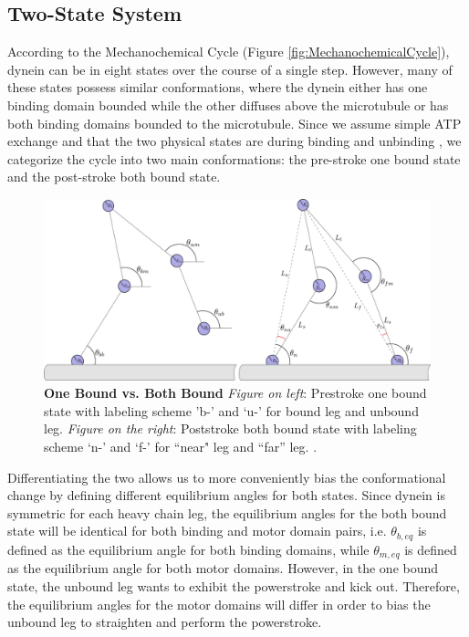 \subsection{Two-State System}
According to the Mechanochemical Cycle (Figure \ref{fig:MechanochemicalCycle}), dynein can be in eight states over the course of a single step. However, many of these states possess similar conformations, where the dynein either has one binding domain bounded while the other diffuses above the microtubule or has both binding domains bounded to the microtubule. Since we assume simple ATP exchange and that the two physical states are during binding and unbinding \cite{}, we categorize the cycle into two main conformations: the pre-stroke one bound state and the post-stroke both bound state.

\begin{figure}[H]
	\centering
	\includegraphics[width=0.9\columnwidth]{Figures/OB_vs_BB.PNG}
	\caption[One Bound vs. Both Bound]{\textbf{One Bound vs. Both Bound} \textit{Figure on left}: Prestroke one bound state with labeling scheme 'b-’ and ‘u-’ for bound leg and unbound leg. \textit{Figure on the right}: Poststroke both bound state with labeling scheme ‘n-’ and ‘f-’ for ``near" leg and ``far'' leg. \cite{Capek2017}.}
	\label{fig:OBvsBB}
\end{figure}

Differentiating the two allows us to more conveniently bias the conformational change by defining different equilibrium angles for both states. Since dynein is symmetric for each heavy chain leg, the equilibrium angles for the both bound state will be identical for both binding and motor domain pairs, i.e. $\theta_{b,eq}$ is defined as the equilibrium angle for both binding domains, while $\theta_{m,eq}$ is defined as the equilibrium angle for both motor domains. However, in the one bound state, the unbound leg wants to exhibit the powerstroke and kick out. Therefore, the equilibrium angles for the motor domains will differ in order to bias the unbound leg to straighten and perform the powerstroke. 


